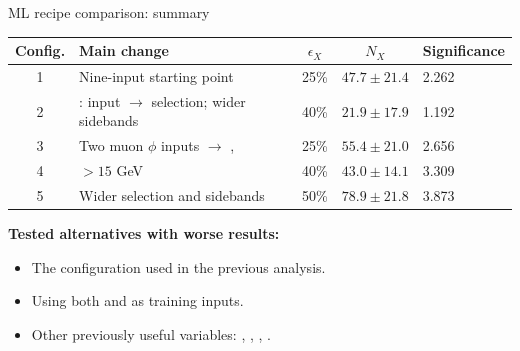 \begin{frame}[label=p9_20260916]{ML recipe comparison: summary}
  \begin{center}\small
  \renewcommand{\arraystretch}{1.15}
  \begin{tabular}{@{}cL{5.3cm}ccL{2.3cm}@{}}
    \toprule
    Config. & Main change & $\epsilon_X$ & $N_X$ & Significance\\
     & Nine-input starting point & 25\% & $47.7\pm21.4$ & 2.262\\
    2 & : input $\to$ selection; wider sidebands & 40\% & $21.9\pm17.9$ & 1.192\\
    3 & Two muon $\phi$ inputs $\to$ ,  & 25\% & $55.4\pm21.0$ & 2.656\\
    4 & $>15$ GeV & 40\% & $43.0\pm14.1$ & 3.309\\
    5 & Wider  selection and sidebands & 50\% & $78.9\pm21.8$ & 3.873\\
    \bottomrule
  \end{tabular}
  \end{center}
  {\small\textbf{Tested alternatives with worse results:}}\par
  \begin{itemize}\small
    \item The configuration used in the previous analysis.
    \item Using both  and  as training inputs.
    \item Other previously useful variables: , ,
          , .
  \end{itemize}
\end{frame}

\begin{frame}[label=p10_20260916]{\strut}
  \centering\vfill
  \vfill
\end{frame}
